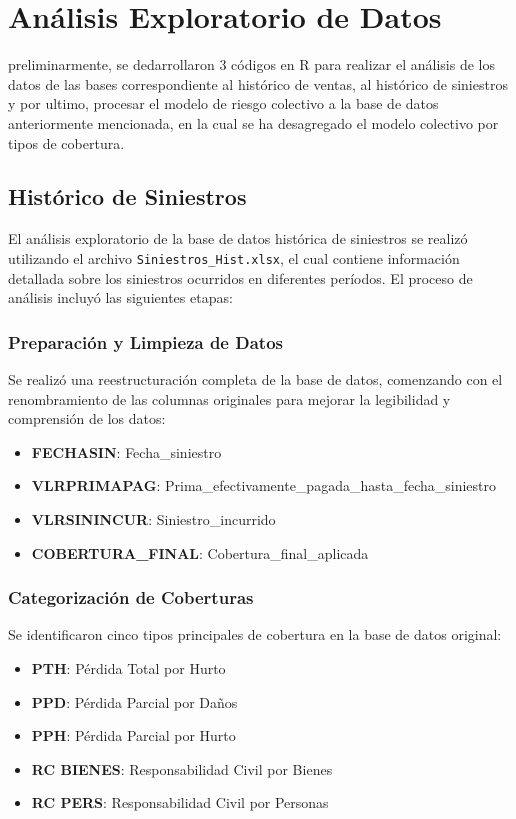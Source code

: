 \section{Análisis Exploratorio de Datos}

preliminarmente, se dedarrollaron 3 códigos en R para realizar el análisis de los datos de las bases correspondiente al histórico de ventas, al histórico de siniestros y por ultimo, procesar el modelo de riesgo colectivo a la base de datos anteriormente mencionada, en la cual se ha desagregado el modelo colectivo por tipos de cobertura.

\subsection{Histórico de Siniestros}

El análisis exploratorio de la base de datos histórica de siniestros se realizó utilizando el archivo \texttt{Siniestros\_Hist.xlsx}, el cual contiene información detallada sobre los siniestros ocurridos en diferentes períodos. El proceso de análisis incluyó las siguientes etapas:

\subsubsection{Preparación y Limpieza de Datos}

Se realizó una reestructuración completa de la base de datos, comenzando con el renombramiento de las columnas originales para mejorar la legibilidad y comprensión de los datos:

\begin{itemize}
    \item \textbf{FECHASIN}: Fecha\_siniestro
    \item \textbf{VLRPRIMAPAG}: Prima\_efectivamente\_pagada\_hasta\_fecha\_siniestro
    \item \textbf{VLRSININCUR}: Siniestro\_incurrido
    \item \textbf{COBERTURA\_FINAL}: Cobertura\_final\_aplicada
\end{itemize}

\subsubsection{Categorización de Coberturas}

Se identificaron cinco tipos principales de cobertura en la base de datos original:
\begin{itemize}
    \item \textbf{PTH}: Pérdida Total por Hurto
    \item \textbf{PPD}: Pérdida Parcial por Daños
    \item \textbf{PPH}: Pérdida Parcial por Hurto
    \item \textbf{RC BIENES}: Responsabilidad Civil por Bienes
    \item \textbf{RC PERS}: Responsabilidad Civil por Personas
\end{itemize}

